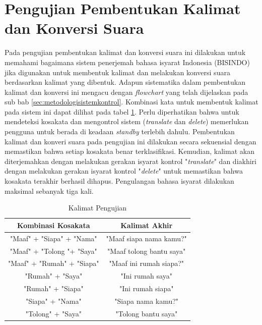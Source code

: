 \section{Pengujian Pembentukan Kalimat dan Konversi Suara}
\label{sec:analisiskalimat}

Pada pengujian pembentukan kalimat dan konversi suara ini dilakukan untuk memahami bagaimana sistem penerjemah bahasa isyarat Indonesia (BISINDO) jika digunakan untuk membentuk kalimat dan melakukan konversi suara berdasarkan kalimat yang dibentuk. Adapun sistematika dalam pembentukan kalimat dan konversi ini mengacu dengan \emph{flowchart} yang telah dijelaskan pada sub bab \ref{sec:metodologisistemkontrol}. Kombinasi kata untuk membentuk kalimat pada sistem ini dapat dilihat pada tabel \ref{tb:kalimatpengujian}. Perlu diperhatikan bahwa untuk mendeteksi kosakata dan mengontrol sistem (\emph{translate} dan \emph{delete}) memerlukan pengguna untuk berada di keadaan \emph{standby} terlebih dahulu. Pembentukan kalimat dan konveri suara pada pengujian ini dilakukan secara sekuensial dengan memastikan bahwa setiap kosakata benar terklasifikasi. Kemudian, kalimat akan diterjemahkan dengan melakukan gerakan isyarat kontrol "\emph{translate}" dan diakhiri dengan melakukan gerakan isyarat kontrol "\emph{delete}" untuk memastikan bahwa kosakata terakhir berhasil dihapus. Pengulangan bahasa isyarat dilakukan maksimal sebanyak tiga kali.

\begin{longtable}{|c|c|}
  \caption{Kalimat Pengujian}
  \label{tb:kalimatpengujian}                                   \\
  \hline
  \rowcolor[HTML]{C0C0C0}
  \textbf{Kombinasi Kosakata} & \textbf{Kalimat Akhir}  \\
  \hline
  "Maaf" + "Siapa" + "Nama"            &  "Maaf siapa nama kamu?"               \\

  "Maaf" + "Tolong "+ "Saya"            & "Maaf tolong bantu saya"                 \\
  
  "Maaf" + "Rumah" + "Siapa"            & "Maaf ini rumah siapa?"                 \\

  "Rumah" + "Saya"            & "Ini rumah saya"                 \\

  "Rumah" + "Siapa"            & "Ini rumah siapa"                 \\

  "Siapa" + "Nama"            & "Siapa nama kamu?"                 \\

  "Tolong" + "Saya"            & "Tolong bantu saya"                 \\
  \hline
\end{longtable}

